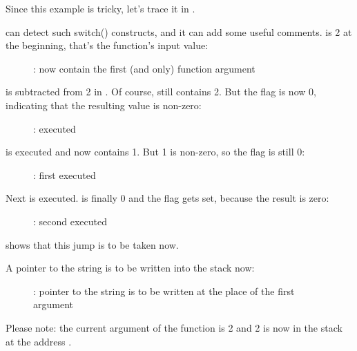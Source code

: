 ﻿\clearpage
\mysubparagraph{\olly}

Since this example is tricky, let's trace it in \olly.

\olly can detect such switch() constructs, and it can add some useful comments.
\EAX is 2 at the beginning, that's the function's input value: 

\begin{figure}[H]
\centering
{}
\caption{\olly: \EAX 
now contain the first (and only) function argument}
\label{fig:switch_few_olly1}
\end{figure}

 is subtracted from 2 in \EAX. 
Of course, \EAX still contains 2.
But the \ZF flag is now 0, indicating that the resulting value is non-zero:

\begin{figure}[H]
\centering
{}
\caption{\olly: \SUB executed}
\label{fig:switch_few_olly2}
\end{figure}

\clearpage
\DEC is executed and \EAX now contains 1. 
But 1 is non-zero, so the \ZF flag is still 0:

\begin{figure}[H]
\centering
{}
\caption{\olly: first \DEC executed}
\label{fig:switch_few_olly3}
\end{figure}

\clearpage
Next \DEC is executed. 
\EAX is finally 0 and the \ZF flag gets set, because the result is zero:

\begin{figure}[H]
\centering
{}
\caption{\olly: second \DEC executed}
\label{fig:switch_few_olly4}
\end{figure}

\olly shows that this jump is to be taken now.

\clearpage
A pointer to the string  is to be written into the stack now:

\begin{figure}[H]
\centering
{}
\caption{\olly: 
pointer to the string is to be written at the place of the first argument}
\label{fig:switch_few_olly5}
\end{figure}

Please note: the current argument of the function is 2 and 2 is now in the stack at the address .

